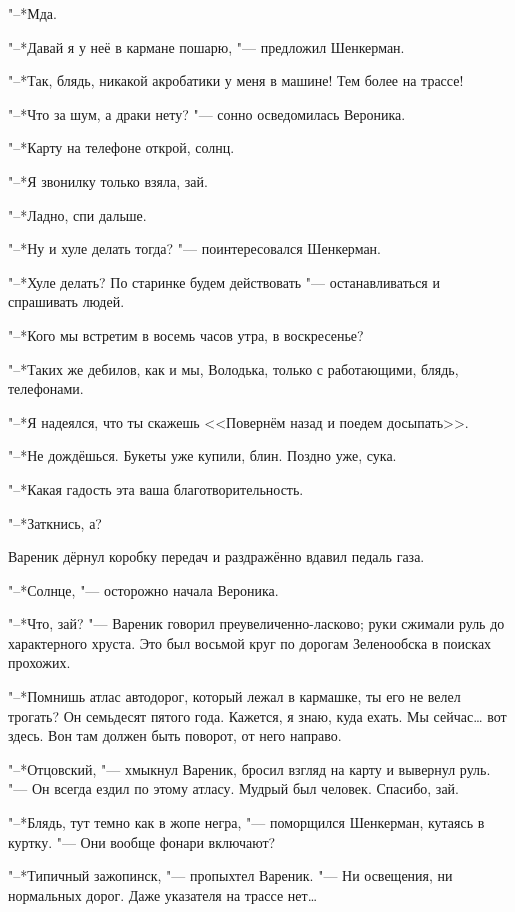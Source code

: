 "--*Мда.

"--*Давай я у неё в кармане пошарю, "--- предложил Шенкерман.

"--*Так, блядь, никакой акробатики у меня в машине!
Тем более на трассе!

"--*Что за шум, а драки нету? "--- сонно осведомилась Вероника.

"--*Карту на телефоне открой, солнц.

"--*Я звонилку только взяла, зай.

"--*Ладно, спи дальше.

"--*Ну и хуле делать тогда? "--- поинтересовался Шенкерман.

"--*Хуле делать?
По старинке будем действовать "--- останавливаться и спрашивать людей.

"--*Кого мы встретим в восемь часов утра, в воскресенье?

"--*Таких же дебилов, как и мы, Володька, только с работающими, блядь, телефонами.

"--*Я надеялся, что ты скажешь <<Повернём назад и поедем досыпать>>.

"--*Не дождёшься.
Букеты уже купили, блин.
Поздно уже, сука.

"--*Какая гадость эта ваша благотворительность.

"--*Заткнись, а?

Вареник дёрнул коробку передач и раздражённо вдавил педаль газа.

\asterism

\textspace

"--*Солнце, "--- осторожно начала Вероника.

"--*Что, зай? "--- Вареник говорил преувеличенно-ласково;
руки сжимали руль до характерного хруста.
Это был восьмой круг по дорогам Зеленообска в поисках прохожих.

"--*Помнишь атлас автодорог, который лежал в кармашке, ты его не велел трогать?
Он семьдесят пятого года.
Кажется, я знаю, куда ехать.
Мы сейчас\dots{} вот здесь.
Вон там должен быть поворот, от него направо.

"--*Отцовский, "--- хмыкнул Вареник, бросил взгляд на карту и вывернул руль.
"--- Он всегда ездил по этому атласу.
Мудрый был человек.
Спасибо, зай.

"--*Блядь, тут темно как в жопе негра, "--- поморщился Шенкерман, кутаясь в куртку.
"--- Они вообще фонари включают?

"--*Типичный зажопинск, "--- пропыхтел Вареник.
"--- Ни освещения, ни нормальных дорог.
Даже указателя на трассе нет\dots{}

